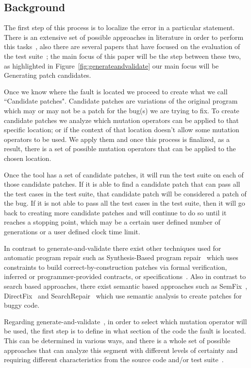 \documentclass[conference]{IEEEtran}
\begin{document}
\subsection{Background}
The first step of this process is to localize the error in a particular 
statement. There is an extensive set of possible approaches in literature in 
order to perform this tasks~\cite{Jones05,Jones02,Chen02,legoues12,Qi13}, also there are several papers that have focused on the evaluation of the test suite~\cite{Qi13,fan15}; the main focus of this paper will be the step between these two, as highlighted in Figure~\ref{fig:generateandvalidate} our main focus will be Generating patch candidates.

Once we know where the fault is located we proceed to create what we call 
``Candidate patches". Candidate patches are variations of the original program 
which may or may not be a patch for the bug(s) we are trying to fix. To 
create candidate patches we analyze which mutation operators can
be applied to that specific location; or if the context of that location doesn't
allow some mutation operators to be used. We apply them and once this process is finalized, as a result, there is a set of possible 
mutation operators that
can be applied to the chosen location.

Once the tool has a set of candidate patches, it will run the test suite on each 
of those candidate patches. If it is able to find a candidate patch that can 
pass all the test cases in the test suite, that candidate patch will be 
considered a patch of the bug. If it is not able to pass all the test cases in 
the test suite, then it will go back to creating more candidate patches and will 
continue to do so until it reaches a stopping point, which may be a certain user 
defined number of generations or a user defined clock time limit.

In contrast to generate-and-validate there exist other techniques used for 
automatic program repair such as Synthesis-Based program 
repair~\cite{jin11,pei14} which uses constraints to build 
correct-by-construction patches via formal verification, inferred or 
programmer-provided contracts,
or specifications~\cite{jin11,wei10}. Also in contrast to search based approaches, there exist semantic based approaches such as SemFix~\cite{nguyen13}, DirectFix~\cite{mechtaev15} and SearchRepair~\cite{ke15} which use semantic analysis to create patches for buggy code.

Regarding generate-and-validate~\cite{legoues12}, in
order to select which mutation operator will be used, the 
first step is to define in what section of the code the fault is located. This can be determined in various ways, and 
there is 
a whole set of
possible approaches that can analyze this segment with different levels of certainty and 
requiring different characteristics from the source code and/or test 
suite~\cite{Jones05,Jones02,Chen02,legoues12,Qi13,Qi2013,Abreu07,wong09}. 
\end{document}
